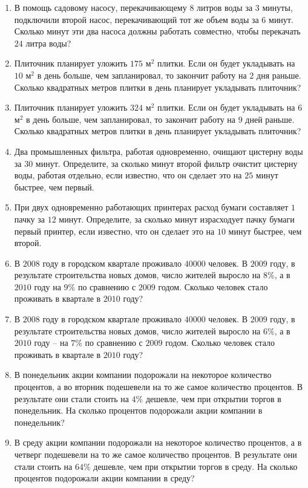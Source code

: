 \documentclass[12pt, a4paper]{article}
\begin{document}
\begin{enumerate}
		\item В помощь садовому насосу, перекачивающему \( 8 \) литров воды за \( 3 \) минуты, подключили второй насос, перекачивающий тот же объем воды за \( 6 \) минут. Сколько минут эти два насоса должны работать совместно, чтобы перекачать \( 24 \) литра воды?
		\item Плиточник планирует уложить \( 175 \) м\( ^2\) плитки. Если он будет укладывать на \( 10 \) м\( ^2 \) в день больше, чем запланировал, то закончит работу на \( 2 \) дня раньше. Сколько квадратных метров плитки в день планирует укладывать плиточник?
		\item  Плиточник планирует уложить \( 324 \) м\( ^2\) плитки. Если он будет укладывать на \( 6 \) м\( ^2 \) в день больше, чем запланировал, то закончит работу на \( 9 \) дней раньше. Сколько квадратных метров плитки в день планирует укладывать плиточник?
		\item Два промышленных фильтра, работая одновременно, очищают цистерну воды за \( 30 \) минут. Определите, за сколько минут второй фильтр очистит цистерну воды, работая отдельно, если известно, что он сделает это на \( 25 \) минут быстрее, чем первый.
		\item При двух одновременно работающих принтерах расход бумаги составляет \( 1 \) пачку за \( 12 \) минут. Определите, за сколько минут израсходует пачку бумаги первый принтер, если известно, что он сделает это на \( 10 \) минут быстрее, чем второй.
		\item В \( 2008 \) году в городском квартале проживало \( 40 000 \) человек. В \( 2009 \) году, в результате строительства новых домов, число жителей выросло на \( 8 \% \), а в \( 2010 \) году на \( 9 \% \) по сравнению с \( 2009 \) годом. Сколько человек стало проживать в квартале в \( 2010  \) году?
		\item В \( 2008 \) году в городском квартале проживало \( 40 000 \) человек. В \( 2009 \) году, в результате строительства новых домов, число жителей выросло на \( 6 \% \), а в \( 2010 \) году – на \( 7\% \) по сравнению с \( 2009 \) годом. Сколько человек стало проживать в квартале в \( 2010 \) году?
		\item В понедельник акции компании подорожали на некоторое количество процентов, а во вторник подешевели на то же самое количество процентов. В результате они стали стоить на \( 4 \%  \) дешевле, чем при открытии торгов в понедельник. На сколько процентов подорожали акции компании в понедельник?
		\item В среду акции компании подорожали на некоторое количество процентов, а в четверг подешевели на то же самое количество процентов. В результате они стали стоить на \( 64\% \) дешевле, чем при открытии торгов в среду. На сколько процентов подорожали акции компании в среду?

\end{enumerate}
\end{document}
